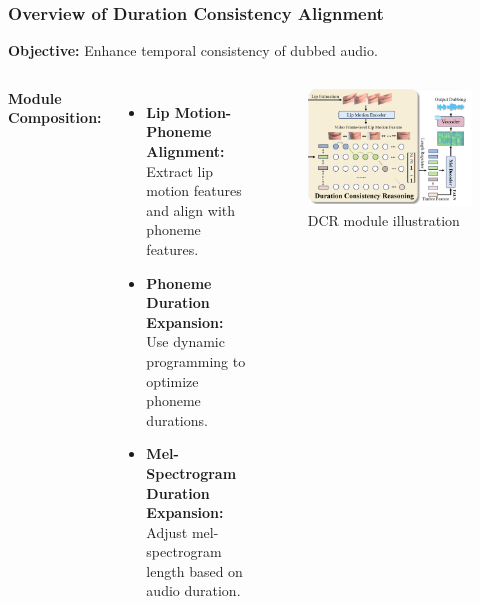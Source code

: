 \begin{frame}
    \frametitle{Overview of Duration Consistency Alignment}
    \textbf{Objective:} Enhance temporal consistency of dubbed audio.
    \begin{columns}[T] %
        \textbf{Module Composition:}
        \begin{itemize}
            \item \textbf{Lip Motion-Phoneme Alignment:} Extract lip motion features and align with phoneme features.
            \item \textbf{Phoneme Duration Expansion:} Use dynamic programming to optimize phoneme durations.
            \item \textbf{Mel-Spectrogram Duration Expansion:} Adjust mel-spectrogram length based on audio duration.
        \end{itemize}
        \begin{figure}
            \centering
            \includegraphics[width=\linewidth]{figs/DCR.png} %
            \caption{DCR module illustration}
            \label{fig:dcr-diagram}
        \end{figure}
    \end{columns}
\end{frame}


